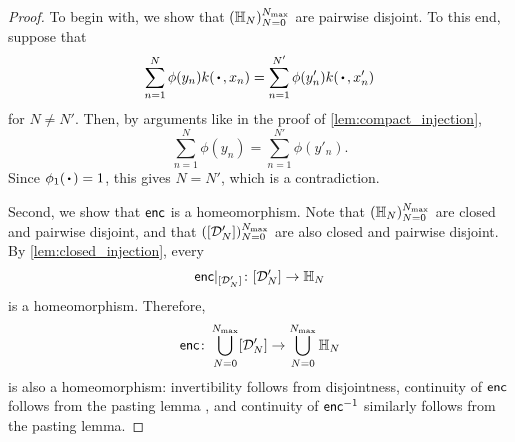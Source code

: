 \documentclass[12pt, twoside]{report}
\begin{document}
\begin{proof}
    To begin with, we show that
    $(\Hb_{N})_{N=0}^{N\ss{max}}$ are pairwise disjoint.
    To this end, suppose that
    \begin{equation}
        \sum_{n=1}^{N} \phi(y_n) k(\vardot, x_n)
        = \sum_{n=1}^{N'} \phi(y'_n) k(\vardot, x'_n)
    \end{equation}
    for $N \neq N'$.
    Then, by arguments like in the proof of \cref{lem:compact_injection},
    \begin{equation}
        \sum_{n=1}^N \phi(y_n)
        = \sum_{n=1}^{N'} \phi(y'_n).
    \end{equation}
    Since $\phi_1(\vardot)=1$, this gives $N = N'$, which is a contradiction.

    Second, we show that $\mathsf{enc}$ is a homeomorphism.
    Note that
    $(\Hb_{N})_{N=0}^{N\ss{max}}$ are closed and pairwise disjoint,
    and that $([\D'_N])_{N=0}^{N\ss{max}}$ are also closed and pairwise disjoint.
    By \cref{lem:closed_injection}, every
    \begin{equation}
        \mathsf{enc}|_{[\mathcal{D}'_N]} \colon [\mathcal{D}'_N] \to \mathbb{H}_N
    \end{equation}
    is a homeomorphism.
    Therefore,
    \begin{equation}
        \enc \colon \union_{N=0}^{N\ss{max}} [\D'_N] \to  \union_{N=0}^{N\ss{max}} \Hb_{N}
    \end{equation}
    is also a homeomorphism:
    invertibility follows from disjointness,
    continuity of $\mathsf{enc}$ follows from the pasting lemma \parencite[Theorem 18.3;][]{Munkres:2000:Topology},
    and continuity of $\mathsf{enc}^{-1}$ similarly follows from the pasting lemma.
\end{proof}
\end{document}
